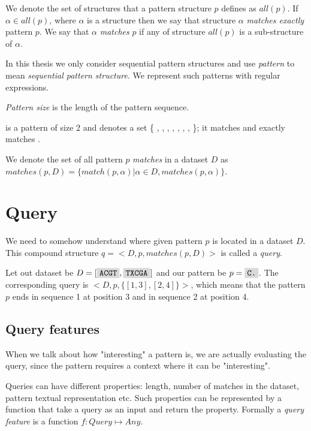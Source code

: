 We denote the set of structures that a pattern structure $p$ defines as $all(p)$. If $\alpha \in all(p)$, where $\alpha$ is a structure then we say that
structure $\alpha$ \emph{matches exactly} pattern $p$. We say that $\alpha$ \emph{matches} $p$ if any of structure $all(p)$ is a sub-structure of $\alpha$.

In this thesis we only consider sequential pattern structures and use \emph{pattern} to mean \emph{sequential pattern structure}. We represent such patterns with regular expressions. 


\emph{Pattern size} is the length of the pattern sequence.

\begin{exmp}
 is a pattern of size 2 and denotes a set 
\{ , , , , , , , \}; it matches  and exactly matches .	
\end{exmp}

We denote the set of all pattern $p$ \emph{matches} in a dataset $D$ as $matches(p, D) = \{ match(p, \alpha) | \alpha \in D, matches(p, \alpha) \}$.

\section{Query}

We need to somehow understand where given pattern $p$ is located in a dataset $D$. This compound structure $q = <D, p, matches(p, D)>$ is called a \emph{query}.

\begin{exmp}
Let out dataset be $D = [ \text{\R{ACGT}}, \text{\R{TXCGA}} ]$ and our pattern be $p = \text{\R{C.}}$. The corresponding query is $<D, p, \{ [1,3], [2,4]\}>$, which means that the pattern $p$ ends in sequence 1 at position 3 and in sequence 2 at position 4.
\end{exmp}

\subsection{Query features}

When we talk about how "interesting" a pattern is, we are actually evaluating the query, since the pattern requires a context where it can be "interesting".

Queries can have different properties: length, number of matches in the dataset, pattern textual representation etc. Such properties can be represented by a function that take a query as an input and return the property. Formally a \emph{query feature} is a function $f: Query \mapsto Any$.

